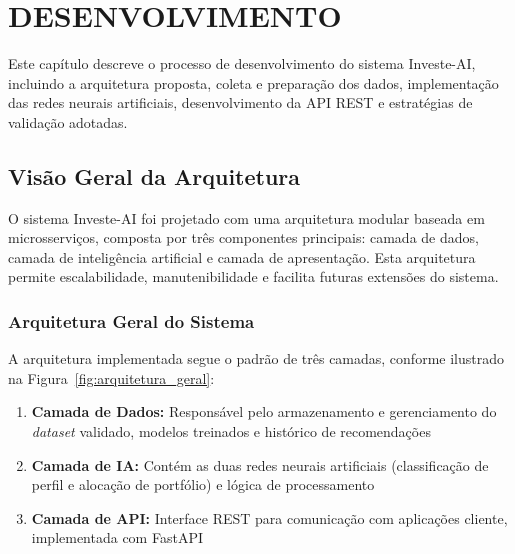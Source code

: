 
\chapter{DESENVOLVIMENTO}

Este capítulo descreve o processo de desenvolvimento do sistema Investe-AI, incluindo a arquitetura proposta, coleta e preparação dos dados, implementação das redes neurais artificiais, desenvolvimento da API REST e estratégias de validação adotadas.

\section{Visão Geral da Arquitetura}

O sistema Investe-AI foi projetado com uma arquitetura modular baseada em microsserviços, composta por três componentes principais: camada de dados, camada de inteligência artificial e camada de apresentação. Esta arquitetura permite escalabilidade, manutenibilidade e facilita futuras extensões do sistema.

\subsection{Arquitetura Geral do Sistema}

A arquitetura implementada segue o padrão de três camadas, conforme ilustrado na Figura~\ref{fig:arquitetura_geral}:

\begin{enumerate}
    \item \textbf{Camada de Dados:} Responsável pelo armazenamento e gerenciamento do \textit{dataset} validado, modelos treinados e histórico de recomendações
    \item \textbf{Camada de IA:} Contém as duas redes neurais artificiais (classificação de perfil e alocação de portfólio) e lógica de processamento
    \item \textbf{Camada de API:} Interface REST para comunicação com aplicações cliente, implementada com FastAPI
\end{enumerate}


